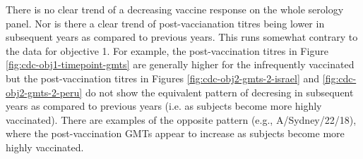 \documentclass[12pt]{article}
\begin{document}
There is no clear trend of a decreasing vaccine response on the whole serology
panel. Nor is there a clear trend of post-vaccianation titres being lower in subsequent years as compared to previous years. This runs somewhat contrary to
the data for objective 1. For example, the post-vaccination titres in Figure \ref{fig:cdc-obj1-timepoint-gmts} are generally higher for the infrequently vaccinated but the post-vaccination titres in Figures \ref{fig:cdc-obj2-gmts-2-israel} and \ref{fig:cdc-obj2-gmts-2-peru} do not show the equivalent pattern of decresing in subsequent years as compared to previous years (i.e. as subjects become more highly vaccinated). There are examples of the opposite pattern (e.g., A/Sydney/22/18), where the post-vaccination GMTs appear to increase as subjects become more highly vaccinated.
\end{document}
